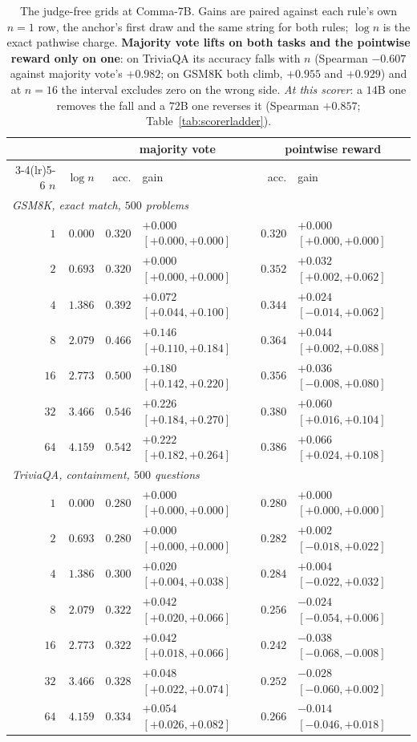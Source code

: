 \begin{table}[t]
\centering\footnotesize
\caption{The judge-free grids at Comma-7B. Gains are paired against each rule's own $n=1$ row, the
anchor's first draw and the same string for both rules; $\log n$ is the exact pathwise charge.
\textbf{Majority vote lifts on both tasks and the pointwise reward only on one}: on TriviaQA its accuracy
falls with $n$ (Spearman $-0.607$ against majority vote's $+0.982$; on GSM8K both climb, $+0.955$ and $+0.929$) and at $n=16$ the interval excludes
zero on the wrong side. \emph{At this scorer}: a $14$B one removes the fall and a $72$B one reverses it
(Spearman $+0.857$; Table~\ref{tab:scorerladder}).}
\label{tab:judgefree}
\begin{tabular}{rr rl rl}
\toprule
& & \multicolumn{2}{c}{majority vote} & \multicolumn{2}{c}{pointwise reward} \\
\cmidrule(lr){3-4}\cmidrule(lr){5-6}
$n$ & $\log n$ & acc. & gain & acc. & gain \\
\midrule
\multicolumn{6}{l}{\emph{GSM8K, exact match, $500$ problems}}\\
$1$ & $0.000$ & $0.320$ & $+0.000$ $[+0.000, +0.000]$ & $0.320$ & $+0.000$ $[+0.000, +0.000]$ \\
$2$ & $0.693$ & $0.320$ & $+0.000$ $[+0.000, +0.000]$ & $0.352$ & $+0.032$ $[+0.002, +0.062]$ \\
$4$ & $1.386$ & $0.392$ & $+0.072$ $[+0.044, +0.100]$ & $0.344$ & $+0.024$ $[-0.014, +0.062]$ \\
$8$ & $2.079$ & $0.466$ & $+0.146$ $[+0.110, +0.184]$ & $0.364$ & $+0.044$ $[+0.002, +0.088]$ \\
$16$ & $2.773$ & $0.500$ & $+0.180$ $[+0.142, +0.220]$ & $0.356$ & $+0.036$ $[-0.008, +0.080]$ \\
$32$ & $3.466$ & $0.546$ & $+0.226$ $[+0.184, +0.270]$ & $0.380$ & $+0.060$ $[+0.016, +0.104]$ \\
$64$ & $4.159$ & $0.542$ & $+0.222$ $[+0.182, +0.264]$ & $0.386$ & $+0.066$ $[+0.024, +0.108]$ \\
\midrule
\multicolumn{6}{l}{\emph{TriviaQA, containment, $500$ questions}}\\
$1$ & $0.000$ & $0.280$ & $+0.000$ $[+0.000, +0.000]$ & $0.280$ & $+0.000$ $[+0.000, +0.000]$ \\
$2$ & $0.693$ & $0.280$ & $+0.000$ $[+0.000, +0.000]$ & $0.282$ & $+0.002$ $[-0.018, +0.022]$ \\
$4$ & $1.386$ & $0.300$ & $+0.020$ $[+0.004, +0.038]$ & $0.284$ & $+0.004$ $[-0.022, +0.032]$ \\
$8$ & $2.079$ & $0.322$ & $+0.042$ $[+0.020, +0.066]$ & $0.256$ & $-0.024$ $[-0.054, +0.006]$ \\
$16$ & $2.773$ & $0.322$ & $+0.042$ $[+0.018, +0.066]$ & $0.242$ & $-0.038$ $[-0.068, -0.008]$ \\
$32$ & $3.466$ & $0.328$ & $+0.048$ $[+0.022, +0.074]$ & $0.252$ & $-0.028$ $[-0.060, +0.002]$ \\
$64$ & $4.159$ & $0.334$ & $+0.054$ $[+0.026, +0.082]$ & $0.266$ & $-0.014$ $[-0.046, +0.018]$ \\
\bottomrule
\end{tabular}
\end{table}

